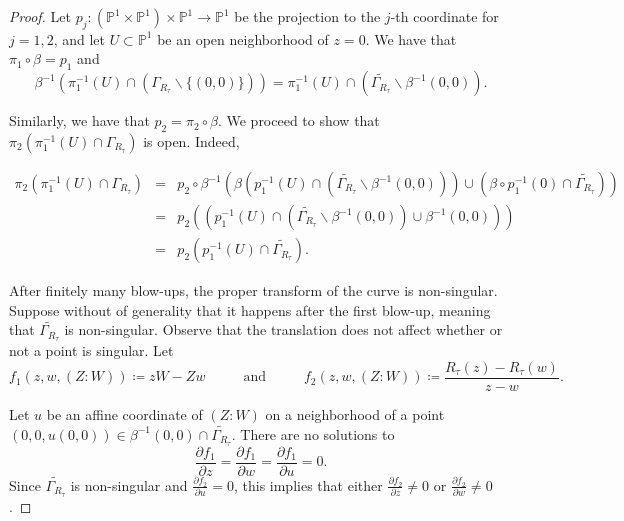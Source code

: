 \documentclass[11pt,letterpaper]{article}
\theoremstyle{definition}
\begin{document}
\begin{proof}
Let $p_j:(\mathbb{P}^1\times\mathbb{P}^1)\times\mathbb{P}^1\to\mathbb{P}^1$ be the projection to the $j$-th coordinate for $j=1,2$, and let $U\subset\mathbb{P}^1$ be an open neighborhood of $z=0$. We have that $\pi_1\circ\beta=p_1$ and
$$\beta^{-1}(\pi_1^{-1}(U)\cap(\Gamma_{R_\tau}\smallsetminus\lbrace(0,0)\rbrace))=\pi_1^{-1}(U)\cap(\widetilde{\Gamma_{R_\tau}}\smallsetminus\beta^{-1}(0,0)).$$

Similarly, we have that $p_2=\pi_2\circ\beta$. We proceed to show that $\pi_2(\pi_1^{-1}(U)\cap\Gamma_{R_\tau})$ is open. Indeed, 

\begin{eqnarray*}
\pi_2(\pi_1^{-1}(U)\cap\Gamma_{R_\tau})&=& p_2\circ\beta^{-1}(\beta(p_1^{-1}(U)\cap (\widetilde{\Gamma_{R_\tau}}\smallsetminus\beta^{-1}(0,0)))\cup (\beta\circ p_1^{-1}(0)\cap\widetilde{\Gamma_{R_\tau}}))\\
&=&p_2((p_1^{-1}(U)\cap(\widetilde{\Gamma_{R_\tau}}\smallsetminus\beta^{-1}(0,0))\cup\beta^{-1}(0,0)))\\
&=&p_2(p_1^{-1}(U)\cap\widetilde{\Gamma_{R_\tau}}).
\end{eqnarray*}

After finitely many blow-ups, the proper transform of the curve is non-singular. Suppose without of generality that it happens after the first blow-up, meaning that $\widetilde{\Gamma_{R_\tau}}$ is non-singular. Observe that the translation does not affect whether or not a point is singular. Let 
$$f_1(z,w,(Z:W))\coloneqq zW-Zw\hspace{1cm}\mbox{ and }\hspace{1cm}f_2(z,w,(Z:W))\coloneqq\frac{R_\tau(z)-R_\tau(w)}{z-w}.$$

Let $u$ be an affine coordinate of $(Z:W)$ on a neighborhood of a point $(0,0,u(0,0))\in\beta^{-1}(0,0)\cap\widetilde{\Gamma_{R_\tau}}$. There are no solutions to 
$$\frac{\partial f_1}{\partial z}=\frac{\partial f_1}{\partial w}=\frac{\partial f_1}{\partial u}=0.$$ 
Since $\widetilde{\Gamma_{R_\tau}}$ is non-singular and $\frac{\partial f_2}{\partial u}=0$, this implies that either $\frac{\partial f_2}{\partial z}\neq 0$ or $\frac{\partial f_2}{\partial w}\neq 0$.


\end{proof}
\end{document}
